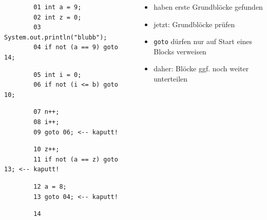 \documentclass[18pt]{beamer}
\begin{document}
	\begin{frame}[fragile]
\small 
\begin{columns}
	\begin{column}{0.5\textwidth}
		\footnotesize
		\begin{verbatim}
		01 int a = 9;
		02 int z = 0;
		03 System.out.println("blubb");
		04 if not (a == 9) goto 14;
		\end{verbatim}
		\begin{verbatim}
		05 int i = 0;
		06 if not (i <= b) goto 10; 
		\end{verbatim}
		\begin{verbatim}
		07 n++;
		08 i++;
		09 goto 06; <-- kaputt!
		\end{verbatim}
		\begin{verbatim}
		10 z++;
		11 if not (a == z) goto 13; <-- kaputt!
		\end{verbatim}
		\begin{verbatim}
		12 a = 8;
		13 goto 04; <-- kaputt!
		\end{verbatim}
		\begin{verbatim}
		14
		\end{verbatim}
	\end{column}%
	\begin{column}{0.5\textwidth}
		\begin{itemize}
			\item haben erste Grundblöcke gefunden
			\item jetzt: Grundblöcke prüfen
			\item \texttt{goto} dürfen nur auf Start eines Blocks verweisen
			\item daher: Blöcke ggf. noch weiter unterteilen
		\end{itemize}
	\end{column}
\end{columns}	
\end{frame}
\end{document}
